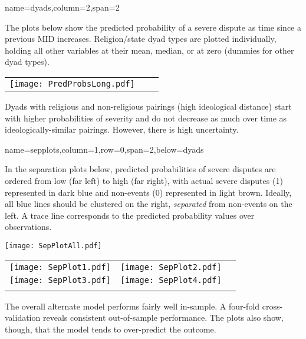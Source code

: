 \documentclass[landscape,paperheight=24in,fontscale=.45,paperwidth=36in,landscape,final]{baposter}
\begin{document}
\begin{poster}
{name=dyads,column=2,span=2}
{
The plots below show the predicted probability of a severe dispute as time since a previous MID increases. Religion/state dyad types are plotted individually, holding all other variables at their mean, median, or at zero (dummies for other dyad types). 
\begin{center}
\begin{tabular}{lcc}
\texttt{[image: PredProbsLong.pdf]}
\end{tabular}
\end{center}
\vspace{-3mm}
Dyads with religious and non-religious pairings (high ideological distance) start with higher probabilities of severity and do not decrease as much over time as ideologically-similar pairings. However, there is high uncertainty.
}


{name=sepplots,column=1,row=0,span=2,below=dyads}
{
In the separation plots below, predicted probabilities of severe disputes are ordered from low (far left) to high (far right), with actual severe disputes (1) represented in dark blue and non-events (0) represented in light brown. Ideally, all blue lines should be clustered on the right, \emph{separated} from non-events on the left. A trace line corresponds to the predicted probability values over observations. 
\vspace{-3mm}
\begin{center}
\texttt{[image: SepPlotAll.pdf]}\\
\end{center}
\vspace{-12mm}
\begin{center}
\begin{tabular}{lcc}
\texttt{[image: SepPlot1.pdf]}&\texttt{[image: SepPlot2.pdf]}\\
\texttt{[image: SepPlot3.pdf]}&\texttt{[image: SepPlot4.pdf]}\\
\vspace{-10mm}
\end{tabular}
\end{center}
\vspace{-3mm}
The overall alternate model performs fairly well in-sample. A four-fold cross-validation reveals consistent out-of-sample performance. The plots also show, though, that the model tends to over-predict the outcome.
}



\end{poster}
\end{document}
